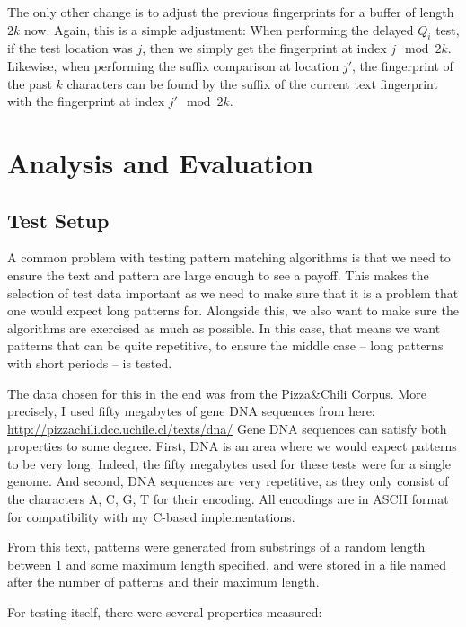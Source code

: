 \documentclass[ %
                    author={Dominic Joseph Moylett},
                    degree={MEng},
                     title={Dictionary Matching with Fingerprints},
                  subtitle={An Empirical Analysis},
                      type={research},
                      year={2015} ]{dissertation}
\begin{document}
The only other change is to adjust the previous fingerprints for a buffer of length $2k$ now. Again, this is a simple adjustment: When performing the delayed $Q_i$ test, if the test location was $j$, then we simply get the fingerprint at index $j \mod 2k$. Likewise, when performing the suffix comparison at location $j'$, the fingerprint of the past $k$ characters can be found by the suffix of the current text fingerprint with the fingerprint at index $j' \mod 2k$.


\chapter{Analysis and Evaluation}
\label{chap:evaluation}

\section{Test Setup}
\label{sec:test-setup}

A common problem with testing pattern matching algorithms is that we need to ensure the text and pattern are large enough to see a payoff. This makes the selection of test data important as we need to make sure that it is a problem that one would expect long patterns for. Alongside this, we also want to make sure the algorithms are exercised as much as possible. In this case, that means we want patterns that can be quite repetitive, to ensure the middle case -- long patterns with short periods -- is tested.

The data chosen for this in the end was from the Pizza\&Chili Corpus. More precisely, I used fifty megabytes of gene DNA sequences from here: \url{http://pizzachili.dcc.uchile.cl/texts/dna/} Gene DNA sequences can satisfy both properties to some degree. First, DNA is an area where we would expect patterns to be very long. Indeed, the fifty megabytes used for these tests were for a single genome. And second, DNA sequences are very repetitive, as they only consist of the characters A, C, G, T for their encoding. All encodings are in ASCII format for compatibility with my C-based implementations.

From this text, patterns were generated from substrings of a random length between 1 and some maximum length specified, and were stored in a file named after the number of patterns and their maximum length.

For testing itself, there were several properties measured:
\end{document}
